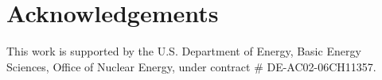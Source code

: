 \documentclass{article}
\begin{document}
\section{Acknowledgements}

This work is supported by the U.S. Department of Energy, Basic Energy Sciences, 
Office of Nuclear Energy, under contract \# DE-AC02-06CH11357.





\end{document}
